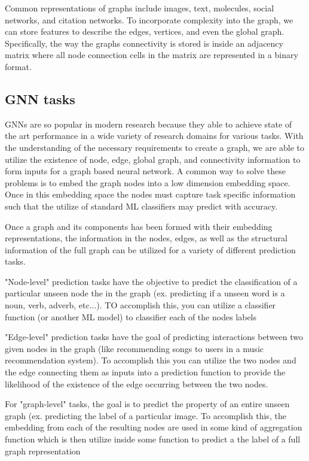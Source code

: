 Common representations of graphs include images, text, molecules, social networks, and citation networks. To incorporate complexity into the graph, we can store features to describe the edges, vertices, and even the global graph. Specifically, the way the graphs connectivity is stored is inside an adjacency matrix where all node connection cells in the matrix are represented in a binary format.

\subsection{GNN tasks}

GNNs are so popular in modern research because they able to achieve state of the art performance in a wide variety of research domains for various tasks. With the understanding of the necessary requirements to create a graph, we are able to utilize the existence of node, edge, global graph, and connectivity information to form inputs for a graph based neural network. A common way to solve these problems is to embed the graph nodes into a low dimension embedding space. Once in this embedding space the nodes must capture task specific information such that the utilize of standard ML classifiers may predict with accuracy. 

Once a graph and its components has been formed with their embedding representations, the information in the nodes, edges, as well as the structural information of the full graph can be utilized for a variety of different prediction tasks.


"Node-level" prediction tasks have the objective to predict the classification of a particular unseen node the in the graph (ex. predicting if a unseen word is a noun, verb, adverb, etc...). TO accomplish this, you can utilize a classifier function (or another ML model) to classifier each of the nodes labels 




"Edge-level" prediction tasks have the goal of predicting interactions between two given nodes in the graph (like recommending songs to users in a music recommendation system). To accomplish this you can utilize the two nodes and the edge connecting them as inputs into a prediction function to provide the likelihood of the existence of the edge occurring between the two nodes.


For "graph-level" tasks, the goal is to predict the property of an entire unseen graph (ex. predicting the label of a particular image. To accomplish this, the embedding from each of the resulting nodes are used in some kind of aggregation function which is then utilize inside some function to predict a the label of a full graph representation \cite{GnnIntro2021}


